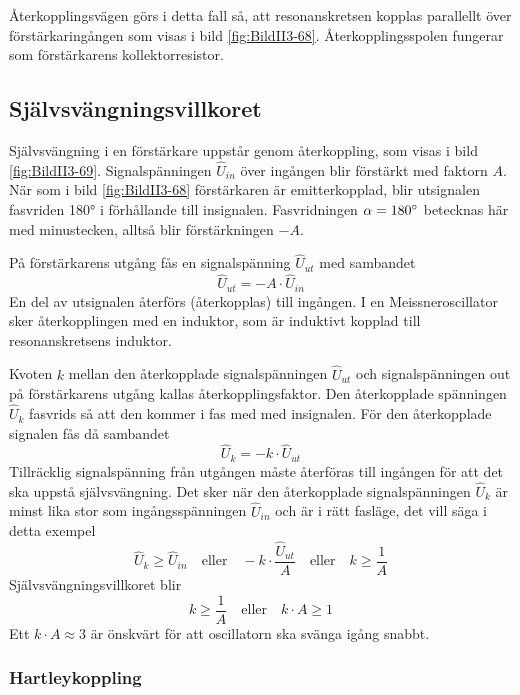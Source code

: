 Återkopplingsvägen görs i detta fall så, att resonanskretsen kopplas
parallellt över förstärkaringången som visas i bild \ref{fig:BildII3-68}.
Återkopplingsspolen fungerar som förstärkarens kollektorresistor.

\subsection{Självsvängningsvillkoret}


Självsvängning i en förstärkare uppstår genom återkoppling, som visas i
bild \ref{fig:BildII3-69}.
Signalspänningen \(\hat{U}_{in}\) över ingången blir förstärkt med
faktorn \(A\).
När som i bild \ref{fig:BildII3-68} förstärkaren är emitterkopplad, blir
utsignalen fasvriden \ang{180} i förhållande till insignalen.
Fasvridningen \(\alpha=180\degree\) betecknas här med minustecken, alltså blir
förstärkningen \(-A\).

På förstärkarens utgång fås en signalspänning \(\hat{U}_{ut}\) med sambandet
%
\[\hat{U}_{ut} = -A \cdot \hat{U}_{in}\]
%
En del av utsignalen återförs (återkopplas) till ingången.
I en Meissneroscillator sker återkopplingen med en induktor, som är
induktivt kopplad till resonanskretsens induktor.

Kvoten \(k\) mellan den återkopplade signalspänningen \(\hat{U}_{ut}\) och
signalspänningen out på förstärkarens utgång kallas återkopplingsfaktor.
Den återkopplade spänningen \(\hat{U}_k\) fasvrids så att den kommer
i fas med med insignalen.
För den återkopplade signalen fås då sambandet
%
\[\hat{U}_k = -k \cdot \hat{U}_{ut}\]
%
Tillräcklig signalspänning från utgången måste återföras till ingången
för att det ska uppstå självsvängning.
Det sker när den återkopplade signalspänningen \(\hat{U}_k\) är minst lika stor
som ingångsspänningen \(\hat{U}_{in}\) och är i rätt fasläge, det vill säga i
detta exempel
%
\[
\hat{U}_k \geq \hat{U}_{in}
\quad \text{eller} \quad
-k \cdot \frac{\hat{U}_{ut}}{A}
\quad \text{eller} \quad
k \geq \frac{1}{A}
\]
%
Självsvängningsvillkoret blir
%
\[
k \geq \frac{1}{A}
\quad \text{eller} \quad
k \cdot A \geq 1
\]
%
Ett \(k \cdot A \approx 3\) är önskvärt för att oscillatorn ska svänga igång
snabbt.

\subsubsection{Hartleykoppling}

